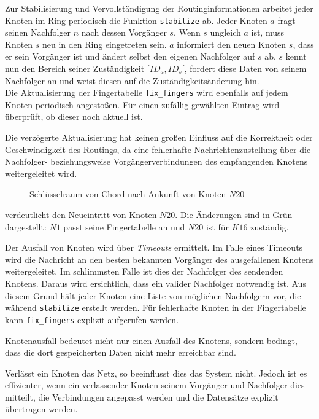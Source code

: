 Zur Stabilisierung und Vervollständigung der Routinginformationen arbeitet jeder Knoten im Ring periodisch die Funktion \texttt{stabilize} ab. Jeder Knoten $a$ fragt seinen Nachfolger $n$ nach dessen Vorgänger $s$. Wenn $s$ ungleich $a$ ist, muss Knoten $s$ neu in den Ring eingetreten sein. $a$ informiert den neuen Knoten $s$, dass er sein Vorgänger ist und ändert selbst den eigenen Nachfolger auf $s$ ab. $s$ kennt nun den Bereich seiner Zuständigkeit $[ID_a, ID_s[$, fordert diese Daten von seinem Nachfolger an und weist diesen auf die Zuständigkeitsänderung hin.\\
Die Aktualisierung der Fingertabelle \texttt{fix\_fingers} wird ebenfalls auf jedem Knoten periodisch angestoßen. Für einen zufällig gewählten Eintrag wird überprüft, ob dieser noch aktuell ist.

Die verzögerte Aktualisierung hat keinen großen Einfluss auf die Korrektheit oder Geschwindigkeit des Routings, da eine fehlerhafte Nachrichtenzustellung über die Nachfolger- beziehungsweise Vorgängerverbindungen des empfangenden Knotens weitergeleitet wird.

\begin{figure}[htbp]
\centering
{}
\caption{Schlüsselraum von Chord nach Ankunft von Knoten $N20$}
\label{fig:chord_new_node}
\end{figure}

 verdeutlicht den Neueintritt von Knoten $N20$. Die Änderungen sind in Grün dargestellt: $N1$ passt seine Fingertabelle an und $N20$ ist für $K16$ zuständig.

Der Ausfall von Knoten wird über \emph{Timeouts} ermittelt. Im Falle eines Timeouts wird die Nachricht an den besten bekannten Vorgänger des ausgefallenen Knotens weitergeleitet. Im schlimmsten Falle ist dies der Nachfolger des sendenden Knotens. Daraus wird ersichtlich, dass ein valider Nachfolger notwendig ist. Aus diesem Grund hält jeder Knoten eine Liste von möglichen Nachfolgern vor, die während \texttt{stabilize} erstellt werden. Für fehlerhafte Knoten in der Fingertabelle kann \texttt{fix\_fingers} explizit aufgerufen werden.

Knotenausfall bedeutet nicht nur einen Ausfall des Knotens, sondern bedingt, dass die dort gespeicherten Daten nicht mehr erreichbar sind.

Verlässt ein Knoten das Netz, so beeinflusst dies das System nicht. Jedoch ist es effizienter, wenn ein verlassender Knoten seinem Vorgänger und Nachfolger dies mitteilt, die Verbindungen angepasst werden und die Datensätze explizit übertragen werden.
